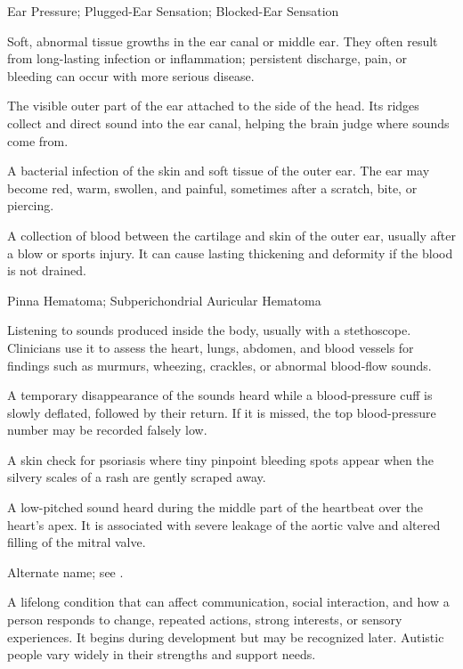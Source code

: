 \synonyms
Ear Pressure; Plugged-Ear Sensation; Blocked-Ear Sensation

 Soft, abnormal tissue growths in the ear canal or middle ear. They often result from long-lasting infection or inflammation; persistent discharge, pain, or bleeding can occur with more serious disease.

 The visible outer part of the ear attached to the side of the head. Its ridges collect and direct sound into the ear canal, helping the brain judge where sounds come from.

 A bacterial infection of the skin and soft tissue of the outer ear. The ear may become red, warm, swollen, and painful, sometimes after a scratch, bite, or piercing.

 A collection of blood between the cartilage and skin of the outer ear, usually after a blow or sports injury. It can cause lasting thickening and deformity if the blood is not drained.

\synonyms
Pinna Hematoma; Subperichondrial Auricular Hematoma

 Listening to sounds produced inside the body, usually with a stethoscope. Clinicians use it to assess the heart, lungs, abdomen, and blood vessels for findings such as murmurs, wheezing, crackles, or abnormal blood-flow sounds.

 A temporary disappearance of the sounds heard while a blood-pressure cuff is slowly deflated, followed by their return. If it is missed, the top blood-pressure number may be recorded falsely low.

 A skin check for psoriasis where tiny pinpoint bleeding spots appear when the silvery scales of a rash are gently scraped away.

 A low-pitched sound heard during the middle part of the heartbeat over the heart's apex. It is associated with severe leakage of the aortic valve and altered filling of the mitral valve.

 Alternate name; see .

 A lifelong condition that can affect
communication, social interaction, and how a person responds to change, repeated
actions, strong interests, or sensory experiences. It begins during development
but may be recognized later. Autistic people vary widely in their strengths and
support needs.

